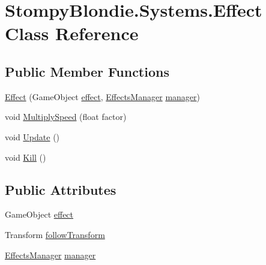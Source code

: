 \hypertarget{class_stompy_blondie_1_1_systems_1_1_effect}{}\section{Stompy\+Blondie.\+Systems.\+Effect Class Reference}
\label{class_stompy_blondie_1_1_systems_1_1_effect}
\subsection*{Public Member Functions}
\begin{DoxyCompactItemize}
\item 
\mbox{\hyperlink{class_stompy_blondie_1_1_systems_1_1_effect_af69895e2de62f92bd139e41305ee99a8}{Effect}} (Game\+Object \mbox{\hyperlink{class_stompy_blondie_1_1_systems_1_1_effect_ab5c9c40c7a8df170f1ac8a631dde8e76}{effect}}, \mbox{\hyperlink{class_stompy_blondie_1_1_systems_1_1_effects_manager}{Effects\+Manager}} \mbox{\hyperlink{class_stompy_blondie_1_1_systems_1_1_effect_a06ce39c8c8192912d9e94a3d337afd4e}{manager}})
\item 
void \mbox{\hyperlink{class_stompy_blondie_1_1_systems_1_1_effect_adb4d706c6819eaae1ef1459e60032ff4}{Multiply\+Speed}} (float factor)
\item 
void \mbox{\hyperlink{class_stompy_blondie_1_1_systems_1_1_effect_a38e13bfc780bf28b651e22f5a2621031}{Update}} ()
\item 
void \mbox{\hyperlink{class_stompy_blondie_1_1_systems_1_1_effect_a23499c024421bfeeb3996d2efd026641}{Kill}} ()
\end{DoxyCompactItemize}
\subsection*{Public Attributes}
\begin{DoxyCompactItemize}
\item 
Game\+Object \mbox{\hyperlink{class_stompy_blondie_1_1_systems_1_1_effect_ab5c9c40c7a8df170f1ac8a631dde8e76}{effect}}
\item 
Transform \mbox{\hyperlink{class_stompy_blondie_1_1_systems_1_1_effect_ad3eb7a90a28a4fbe361214890cdb06b4}{follow\+Transform}}
\item 
\mbox{\hyperlink{class_stompy_blondie_1_1_systems_1_1_effects_manager}{Effects\+Manager}} \mbox{\hyperlink{class_stompy_blondie_1_1_systems_1_1_effect_a06ce39c8c8192912d9e94a3d337afd4e}{manager}}
\end{DoxyCompactItemize}


